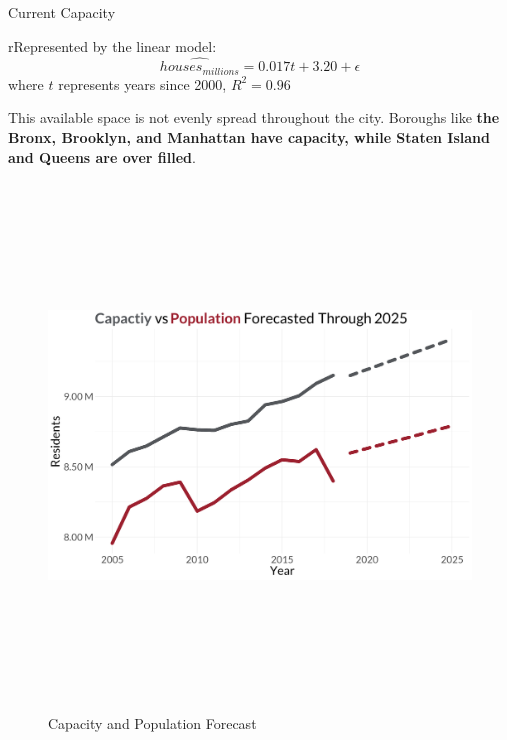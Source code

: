 \documentclass[final]{beamer}
\newlength{\colwidth}
\begin{document}
\begin{frame}[t]
\begin{columns}[t]
\begin{column}{\colwidth}
\begin{block}{Current Capacity}
  \begin{alertblock}
    rRepresented by the linear model:
    \centering$$\hat{houses_{millions}} = 0.017t + 3.20 + \epsilon$$
    where $t$ represents years since 2000, $R^2 = 0.96$
  \end{alertblock}
  
  \vspace{-1cm}
  
    This available space is not evenly spread throughout the city. Boroughs like \textbf{the Bronx, Brooklyn, and Manhattan have capacity, while Staten Island and Queens are over filled}.
  
  \begin{figure}
      {\centering
      \includegraphics[height = 5.5in]{pics/pop_vs_capacity.png}
      \caption{Capacity and Population Forecast}
      \label{fig:my_label}
      \par}
  \end{figure}
  
  \end{block}


\newline\newline\newline

\end{column}


\end{columns}
\end{frame}
\end{document}
